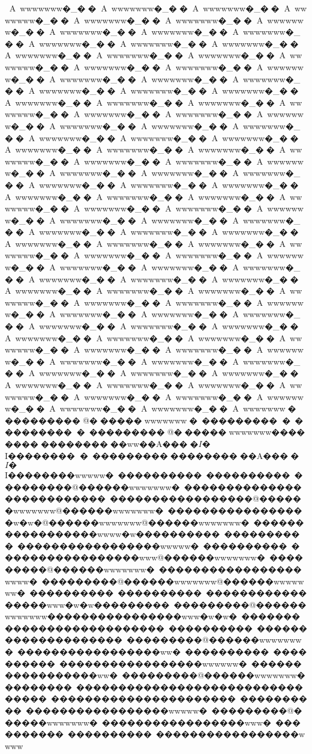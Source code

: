 {{{{{{{{{{{{{{{{{{{{{{{{{{{{{{{{{{{{{{{{{{{{{{{{{{{{{{{{{{{{{{{{{{{{{{{{{{{{{A~wwwwwww�_��A~wwwwwww�_��A~wwwwwww�_��A~wwwwwww�_��A~wwwwwww�_��A~wwwwwww�_��A~wwwwwww�_��A~wwwwwww�_��A~wwwwwww�_��A~wwwwwww�_��A~wwwwwww�_��A~wwwwwww�_��A~wwwwwww�_��A~wwwwwww�_��A~wwwwwww�_��A~wwwwwww�_��A~wwwwwww�_��A~wwwwwww�_��A~wwwwwww�_��A~wwwwwww�_��A~wwwwwww�_��A~wwwwwww�_��A~wwwwwww�_��A~wwwwwww�_��A~wwwwwww�_��A~wwwwwww�_��A~wwwwwww�_��A~wwwwwww�_��A~wwwwwww�_��A~wwwwwww�_��A~wwwwwww�_��A~wwwwwww�_��A~wwwwwww�_��A~wwwwwww�_��A~wwwwwww�_��A~wwwwwww�_��A~wwwwwww�_��A~wwwwwww�_��A~wwwwwww�_��A~wwwwwww�_��A~wwwwwww�_��A~wwwwwww�_��A~wwwwwww�_��A~wwwwwww�_��A~wwwwwww�_��A~wwwwwww�_��A~wwwwwww�_��A~wwwwwww�_��A~wwwwwww�_��A~wwwwwww�_��A~wwwwwww�_��A~wwwwwww�_��A~wwwwwww�_��A~wwwwwww�_��A~wwwwwww�_��A~wwwwwww�_��A~wwwwwww�_��A~wwwwwww�_��A~wwwwwww�_��A~wwwwwww�_��A~wwwwwww�_��A~wwwwwww�_��A~wwwwwww�_��A~wwwwwww�_��A~wwwwwww�_��A~wwwwwww�_��A~wwwwwww�_��A~wwwwwww�_��A~wwwwwww�_��A~wwwwwww�_��A~wwwwwww�_��A~wwwwwww�_��A~wwwwwww�_��A~wwwwwww�_��A~wwwwwww�_��A~wwwwwww�_��A~wwwwwww�_��A~wwwwwww�_��A~wwwwwww�_��A~wwwwwww�_��A~wwwwwww�_��A~wwwwwww�_��A~wwwwwww�_��A~wwwwwww�_��A~wwwwwww�_��A~wwwwwww�_��A~wwwwwww�_��A~wwwwwww�_��A~wwwwwww�_��A~wwwwwww�_��A~wwwwwww�_��A~wwwwwww�_��A~wwwwwww�_��A~wwwwwww�_��A~wwwwwww�_��A~wwwwwww�_��A~wwwwwww�_��A~wwwwwww�_��A~wwwwwww�_��A~wwwwwww�_��A~wwwwwww�_��A~wwwwwww�_��A~wwwwwww�_��A~wwwwwww�_��A~wwwwwww�_��A~wwwwwww�_��A~wwwwwww�_��A~wwwwwww�_��A~wwwwwww�_��A~wwwwwww�_��A~wwwwwww�_��A~wwwwwww�_��A~wwwwwww�_��A~wwwwwww�~���������   @������wwwwwww�~���������   �~���������   �~���������   @������wwwwwww��������       ��������� � w w��A���   �$I�$I��������       �~���������   ��������       ��A���   �$I�$I��������www w w�~���������   �~���������   �~���������   @������wwwwwww�~���������   ��������       ��������       �~���������   ��������       @������wwwwwww@������wwwwwww�~���������   ��������   w�w�@������wwwwwww@������wwwwwww�~���������   ��������wwww�w���������       �~���������   �~���������   ��������wwww w �~���������   �~���������   �������� w w w @������wwwwwww�~���������   @������wwwwwww�~���������   ��������   wwww�~���������   @������wwwwwww@������wwwwwww�~���������   �~���������   �~���������   ��������www�w�w��������       �~���������   @������wwwwwww��������       ��������www�w�w�~���������   ��������       ��������       �~���������   �~���������   ��������� �    �~���������   @������wwwwwww�~���������   ��������w w    �~���������   �~���������   �~���������   ��������w wwwww�~���������   ��������w w    �~���������   @������wwwwwww��������       �~���������   ��������� �������������       �~���������   ��������� � � ��~���������   �~���������   �������� w wwww�~���������   @������wwwwwww�~���������   ��������www    �~���������   �~���������   �~���������   ��������w w w w}}}}}}}}}}}}}}}}}}}}}}}}}}}}}}}}}}}}}}}}}}}}}}}}}}}}}}}}}}}}}}}}}}}}}}}}}}}}}
